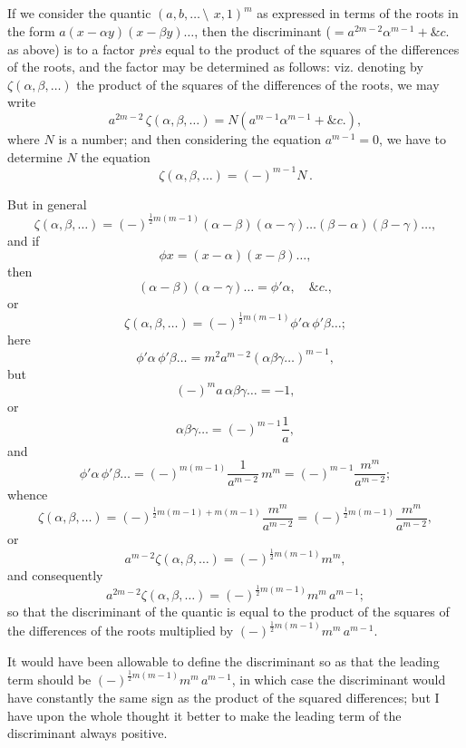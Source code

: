 \documentclass[12pt,a4paper]{article}
\begin{document}
\subsection{}

If we consider the quantic $(a, b, \ldots \,\setminus\!\!\:\, x, 1)^m$ as expressed in terms of the roots in the form $a(x - \alpha y)(x - \beta y)\ldots$, then the discriminant ($= a^{2m-2}\alpha^{m-1} + \&c.$ as above) is to a factor \textit{pr\`es} equal to the product of the squares of the differences of the roots, and the factor may be determined as follows: viz. denoting by $\zeta(\alpha, \beta, \ldots)$ the product of the squares of the differences of the roots, we may write
\[
a^{2m-2}\,\zeta(\alpha, \beta, \ldots) = N(a^{m-1}\alpha^{m-1} + \&c.),
\]
where $N$ is a number; and then considering the equation $a^{m-1} = 0$, we have to determine $N$ the equation
\[
\zeta(\alpha, \beta, \ldots) = (-)^{m-1}N\,.
\]

But in general
\[
\zeta(\alpha, \beta, \ldots) = (-)^{\frac{1}{2}m(m-1)}(\alpha - \beta)(\alpha - \gamma)\ldots(\beta - \alpha)(\beta - \gamma)\ldots,
\]
and if
\[
\phi x = (x - \alpha)(x - \beta)\ldots,
\]
then
\[
(\alpha - \beta)(\alpha - \gamma)\ldots = \phi'\alpha, \quad \&c.,
\]
or
\[
\zeta(\alpha, \beta, \ldots) = (-)^{\frac{1}{2}m(m-1)}\phi'\alpha\,\phi'\beta\ldots;
\]
here
\[
\phi'\alpha\,\phi'\beta\ldots = m^2 a^{m-2}(\alpha\beta\gamma\ldots)^{m-1},
\]
but
\[
(-)^m a\,\alpha\beta\gamma\ldots = -1,
\]
or
\[
\alpha\beta\gamma\ldots = (-)^{m-1}\frac{1}{a},
\]
and
\[
\phi'\alpha\,\phi'\beta\ldots = (-)^{m(m-1)}\frac{1}{a^{m-2}}\,m^m = (-)^{m-1}\frac{m^m}{a^{m-2}};
\]
whence
\[
\zeta(\alpha, \beta, \ldots) = (-)^{\frac{1}{2}m(m-1)+m(m-1)}\frac{m^m}{a^{m-2}} = (-)^{\frac{1}{2}m(m-1)}\frac{m^m}{a^{m-2}},
\]
or
\[
a^{m-2}\zeta(\alpha, \beta, \ldots) = (-)^{\frac{1}{2}m(m-1)}m^m,
\]
and consequently
\[
a^{2m-2}\zeta(\alpha, \beta, \ldots) = (-)^{\frac{1}{2}m(m-1)}m^m\,a^{m-1};
\]
so that the discriminant of the quantic is equal to the product of the squares of the differences of the roots multiplied by $(-)^{\frac{1}{2}m(m-1)}m^m\,a^{m-1}$.

It would have been allowable to define the discriminant so as that the leading term should be $(-)^{\frac{1}{2}m(m-1)}m^m\,a^{m-1}$, in which case the discriminant would have constantly the same sign as the product of the squared differences; but I have upon the whole thought it better to make the leading term of the discriminant always positive.

\subsection{}
\end{document}
